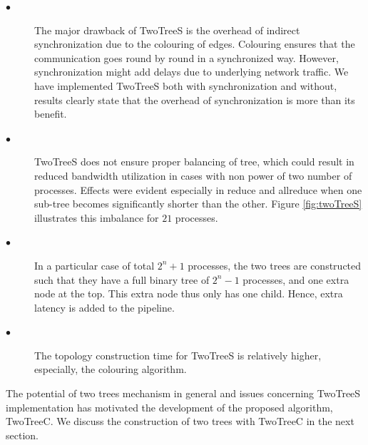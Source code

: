 \documentclass[sigplan,review,anonymous]{acmart}\settopmatter{printfolios=true,printccs=false,printacmref=false}
\begin{document}
\begin{description}
    \item[$\bullet$]The major drawback of TwoTreeS is the overhead of indirect synchronization due to the colouring of edges. Colouring ensures that the communication goes round by round in a synchronized way. However, synchronization might add delays due to underlying network traffic. We have implemented TwoTreeS both with synchronization and without, results clearly state that the overhead of synchronization is more than its benefit.
    \item[$\bullet$]TwoTreeS does not ensure proper balancing of tree, which could result in reduced bandwidth utilization in cases with non power of two number of processes. Effects were evident especially in reduce and allreduce when one sub-tree becomes significantly shorter than the other. Figure \ref{fig:twoTreeS} illustrates this imbalance for $21$ processes.
    \item[$\bullet$]In a particular case of total \(2^n+1\) processes, the two trees are constructed such that they have a full binary tree of \(2^n-1\) processes, and one extra node at the top. This extra node thus only has one child. Hence, extra latency is added to the pipeline.
    \item[$\bullet$]The topology construction time for TwoTreeS is relatively higher, especially, the colouring algorithm.
\end{description}

The potential of two trees mechanism in general and issues concerning TwoTreeS implementation has motivated the development of the proposed algorithm, TwoTreeC. We discuss the construction of two trees with TwoTreeC in the next section.

% 
% 
\end{document}
